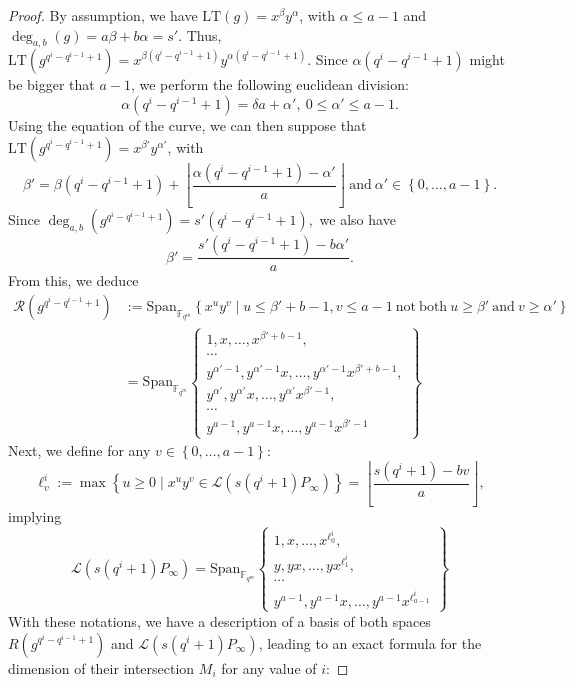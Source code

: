 \documentclass[a4paper]{article}
\theoremstyle{definition}
\theoremstyle{remark}
\newcommand{\calL}{\mathcal{L}}
\newcommand{\calR}{\mathcal{R}}
\newcommand{\fqm}{\mathbb{F}_{q^m}}
\newcommand{\set}[1]{\left\{#1\right\}}
\newcommand{\degab}[1]{\deg_{a,b}\left(#1\right)}
\begin{document}
\begin{proof}


By assumption, we have $\mathrm{LT}(g)=x^{\beta}y^{\alpha}$, with $\alpha \leq a-1$ and $\degab{g}=a\beta +b\alpha=s'$. 
Thus, $\mathrm{LT}(g^{q^i-q^{i-1}+1})=x^{\beta (q^i-q^{i-1}+1)}y^{\alpha (q^i-q^{i-1}+1)}$. Since $\alpha (q^i-q^{i-1}+1)$ might be bigger that $a-1$, we perform the following euclidean division:
$$\alpha (q^i-q^{i-1}+1) = \delta a + \alpha', \ 0 \leq \alpha' \leq a-1.$$
Using the equation of the curve, we can then suppose that $\mathrm{LT}(g^{q^i-q^{i-1}+1})=x^{\beta'}y^{\alpha '}$, with 
$$\beta' = \beta (q^i-q^{i-1}+1) + \left\lfloor \frac{\alpha (q^i-q^{i-1}+1)-\alpha'}{a} \right\rfloor \ \mathrm{and} \ \alpha' \in \set{0,\dots,a-1}.$$
Since $\degab{g^{q^i-q^{i-1}+1}} = s'(q^i-q^{i-1}+1),$ we also have 
\begin{equation} \label{eq:value_beta_prime}
\beta' = \dfrac{s'(q^i-q^{i-1}+1)-b\alpha'}{a}.
\end{equation}
From this, we deduce
\begin{align*}
\calR\left(g^{q^i-q^{i-1}+1}\right) &:= \mathrm{Span}_{\fqm} \left\{x^uy^v \mid u \leq \beta'+b-1 , v \leq a-1 \ \mathrm{not \ both} \ u \geq \beta' \ \mathrm{and} \ v \geq \alpha'\right\} \\
&= \mathrm{Span}_{\fqm}    \left\{ \begin{array}{c}
         1,x,\dots,x^{\beta' +b-1},   \\
         \cdots \\
         y^{\alpha' -1},y^{\alpha' -1}x,\dots,y^{\alpha' -1}x^{\beta' +b-1}, \\
          y^{\alpha'},y^{\alpha'}x,\dots,y^{\alpha'}x^{\beta'-1}, \\
         \cdots \\
         y^{a-1},y^{a-1}x,\dots,y^{a-1}x^{\beta'-1}
    \end{array}
    \right\}
\end{align*}
Next, we define for any $v \in \set{0,\dots,a-1}$:
$$\ell^i_v := \max \set{u \geq 0 \mid x^uy^v \in \calL(s(q^i+1)P_\infty)} = \left\lfloor \dfrac{s(q^i+1)-bv}{a}\right\rfloor,$$
implying
\begin{equation*}
\calL(s(q^i+1)P_\infty) = \mathrm{Span}_{\fqm}    \left\{ \begin{array}{c}
         1,x,\dots,x^{\ell^i_0},   \\
         y,yx,\dots,yx^{\ell^i_1}, \\
         \cdots \\
         y^{a-1},y^{a-1}x,\dots,y^{a-1}x^{\ell^i_{a-1}}
    \end{array}
    \right\}
\end{equation*}
With these notations, we have a description of a basis of both spaces $R(g^{q^i-q^{i-1}+1})$ and $\calL(s(q^i+1)P_\infty)$, leading to an exact formula for the dimension of their intersection $M_i$ for any value of $i$:



\end{proof}
\end{document}
